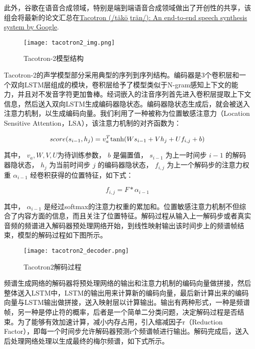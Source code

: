 \documentclass[cn,10pt,math=newtx,citestyle=gb7714-2015,bibstyle=gb7714-2015]{elegantbook}
\begin{document}
此外，谷歌在语音合成领域，特别是端到端语音合成领域做出了开创性的共享，该组会将最新的论文汇总在\href{https://google.github.io/tacotron/}{Tacotron (/täkōˌträn/): An end-to-end speech synthesis system by Google}.

\begin{figure}[htbp]
  \centering
  \texttt{[image: tacotron2\_img.png]}
  \caption{Tacotron-2模型结构 \label{fig:tacotron2}}
\end{figure}

Tacotron-2的声学模型部分采用典型的序列到序列结构。编码器是3个卷积层和一个双向LSTM层组成的模块，卷积层给予了模型类似于N-gram感知上下文的能力，并且对不发音字符更加鲁棒。经词嵌入的注音序列首先进入卷积层提取上下文信息，然后送入双向LSTM生成编码器隐状态。编码器隐状态生成后，就会被送入注意力机制，以生成编码向量。我们利用了一种被称为位置敏感注意力（Location Sensitive Attention，LSA），该注意力机制的对齐函数为：

\begin{equation}
  score(s_{i-1},h_j)=v_a^T{\rm tanh}(Ws_{i-1}+Vh_j+Uf_{i,j}+b)
\end{equation}

其中， $v_a,W,V,U$为待训练参数， $b$ 是偏置值， $s_{i-1}$ 为上一时间步 $i-1$ 的解码器隐状态， $h_j$ 为当前时间步 $j$ 的编码器隐状态， $f_{i,j}$ 为上一个解码步的注意力权重 $\alpha_{i-1}$ 经卷积获得的位置特征，如下式：

\begin{equation}
  f_{i,j}=F*\alpha_{i-1}
\end{equation}

其中， $\alpha_{i-1}$ 是经过softmax的注意力权重的累加和。位置敏感注意力机制不但综合了内容方面的信息，而且关注了位置特征。解码过程从输入上一解码步或者真实音频的频谱进入解码器预处理网络开始，到线性映射输出该时间步上的频谱帧结束，模型的解码过程如下图所示。

\begin{figure}[htbp]
  \centering
  \texttt{[image: tacotron2\_decoder.png]}
  \caption{Tacotron2解码过程 \label{fig:tacotron2_decoder}}
\end{figure}

频谱生成网络的解码器将预处理网络的输出和注意力机制的编码向量做拼接，然后整体送入LSTM中，LSTM的输出用来计算新的编码向量，最后新计算出来的编码向量与LSTM输出做拼接，送入映射层以计算输出。输出有两种形式，一种是频谱帧，另一种是停止符的概率，后者是一个简单二分类问题，决定解码过程是否结束。为了能够有效加速计算，减小内存占用，引入缩减因子r（Reduction Factor），即每一个时间步允许解码器预测r个频谱帧进行输出。解码完成后，送入后处理网络处理以生成最终的梅尔频谱，如下式所示。
\end{document}
